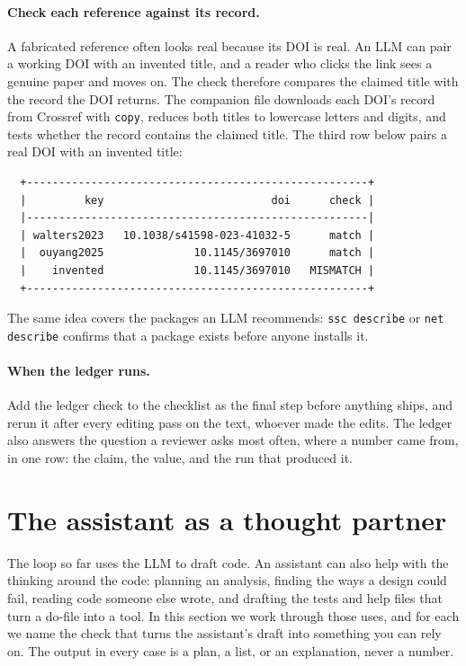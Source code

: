 \paragraph{Check each reference against its record.} A fabricated reference often looks real because its DOI is real. An LLM can pair a working DOI with an invented title, and a reader who clicks the link sees a genuine paper and moves on. The check therefore compares the claimed title with the record the DOI returns. The companion file downloads each DOI's record from Crossref with \texttt{copy}, reduces both titles to lowercase letters and digits, and tests whether the record contains the claimed title. The third row below pairs a real DOI with an invented title:
\par
{\footnotesize
\begin{verbatim}
  +-----------------------------------------------------+
  |         key                          doi      check |
  |-----------------------------------------------------|
  | walters2023   10.1038/s41598-023-41032-5      match |
  |  ouyang2025              10.1145/3697010      match |
  |    invented              10.1145/3697010   MISMATCH |
  +-----------------------------------------------------+
\end{verbatim}
}
The same idea covers the packages an LLM recommends: \texttt{ssc describe} or \texttt{net describe} confirms that a package exists before anyone installs it.

\paragraph{When the ledger runs.} Add the ledger check to the checklist as the final step before anything ships, and rerun it after every editing pass on the text, whoever made the edits. The ledger also answers the question a reviewer asks most often, where a number came from, in one row: the claim, the value, and the run that produced it.

\section{The assistant as a thought partner}\label{sec:ch13-partner}
The loop so far uses the LLM to draft code. An assistant can also help with the thinking around the code: planning an analysis, finding the ways a design could fail, reading code someone else wrote, and drafting the tests and help files that turn a do-file into a tool. In this section we work through those uses, and for each we name the check that turns the assistant's draft into something you can rely on. The output in every case is a plan, a list, or an explanation, never a number.

